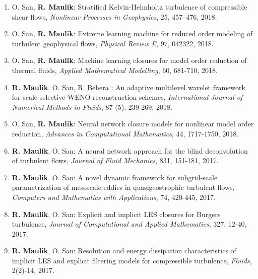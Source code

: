 \documentclass[letterpaper]{article}
\begin{document}
\begin{enumerate}
\item O. San, \textbf{R. Maulik}: Stratified Kelvin-Helmholtz turbulence of compressible shear flows, {\it Nonlinear Processes in Geophysics}, 25, 457--476, 2018.

\item O. San, \textbf{R. Maulik}: Extreme learning machine for reduced order modeling of turbulent geophysical flows, {\it Physical Review E}, 97, 042322, 2018. 

\item O. San, \textbf{R. Maulik}: Machine learning closures for model order reduction of thermal fluids,  {\it Applied Mathematical Modelling}, 60, 681-710, 2018. 

\item \textbf{R. Maulik}, O. San, R. Behera : An adaptive multilevel wavelet framework for scale-selective WENO reconstruction schemes, {\it International Journal of Numerical Methods in Fluids}, 87 (5), 239-269, 2018. 

\item O. San, \textbf{R. Maulik}: Neural network closure models for nonlinear model order reduction, {\it Advances in Computational Mathematics}, 44, 1717-1750, 2018. 


\item \textbf{R. Maulik}, O. San: A neural network approach for the blind deconvolution of turbulent flows, {\it Journal of Fluid Mechanics}, 831, 151-181, 2017. 

\item \textbf{R. Maulik}, O. San: A novel dynamic framework for subgrid-scale parametrization of mesoscale eddies in quasigeostrophic turbulent flows, {\it Computers and Mathematics with Applications}, 74, 420-445, 2017. 

\item \textbf{R. Maulik}, O. San: Explicit and implicit LES closures for Burgers turbulence, {\it Journal of Computational and Applied Mathematics}, 327, 12-40, 2017. 

\item \textbf{R. Maulik}, O. San: Resolution and energy dissipation characteristics of implicit LES and explicit filtering models for compressible turbulence, {\it Fluids}, 2(2)-14, 2017. 


\end{enumerate}
\end{document}
